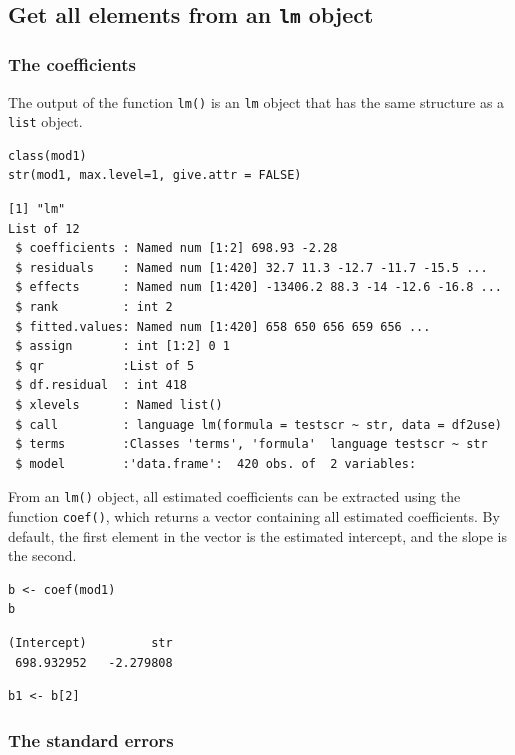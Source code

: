 \documentclass[11pt]{article}
\begin{document}
\subsection*{Get all elements from an \texttt{lm} object}
\label{sec:orgd78f922}

\subsubsection*{The coefficients}
\label{sec:org014a1e2}

The output of the function \texttt{lm()} is an \texttt{lm} object that has the same
structure as a \texttt{list} object.
\begin{verbatim}
class(mod1)
str(mod1, max.level=1, give.attr = FALSE)
\end{verbatim}

\begin{verbatim}
[1] "lm"
List of 12
 $ coefficients : Named num [1:2] 698.93 -2.28
 $ residuals    : Named num [1:420] 32.7 11.3 -12.7 -11.7 -15.5 ...
 $ effects      : Named num [1:420] -13406.2 88.3 -14 -12.6 -16.8 ...
 $ rank         : int 2
 $ fitted.values: Named num [1:420] 658 650 656 659 656 ...
 $ assign       : int [1:2] 0 1
 $ qr           :List of 5
 $ df.residual  : int 418
 $ xlevels      : Named list()
 $ call         : language lm(formula = testscr ~ str, data = df2use)
 $ terms        :Classes 'terms', 'formula'  language testscr ~ str
 $ model        :'data.frame':	420 obs. of  2 variables:
\end{verbatim}

From an \texttt{lm()} object, all estimated coefficients can be extracted
using the function \texttt{coef()}, which returns a vector containing all
estimated coefficients. By default, the first element in the vector is
the estimated intercept, and the slope is the second.

\begin{verbatim}
b <- coef(mod1)
b
\end{verbatim}

\begin{verbatim}
(Intercept)         str
 698.932952   -2.279808
\end{verbatim}

\begin{verbatim}
b1 <- b[2]
\end{verbatim}

\subsubsection*{The standard errors}
\label{sec:orgdcad95a}
\end{document}
